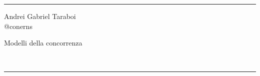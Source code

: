 \documentclass[a4paper]{article}
\begin{document}

\fancyhead[C]{}
\hrule \medskip %
\begin{minipage}{0.295\textwidth} 
\raggedright
\footnotesize
Andrei Gabriel Taraboi \hfill\\   
@conerns\hfill\\
\end{minipage}
\begin{minipage}{0.4\textwidth} 
\centering 
\large 
Modelli della concorrenza\\ 
\normalsize 
\end{minipage}
\begin{minipage}{0.295\textwidth} 
\raggedleft
\hfill\\
\end{minipage}
\medskip\hrule 
\bigskip

\tableofcontents
\newpage
























\end{document}

